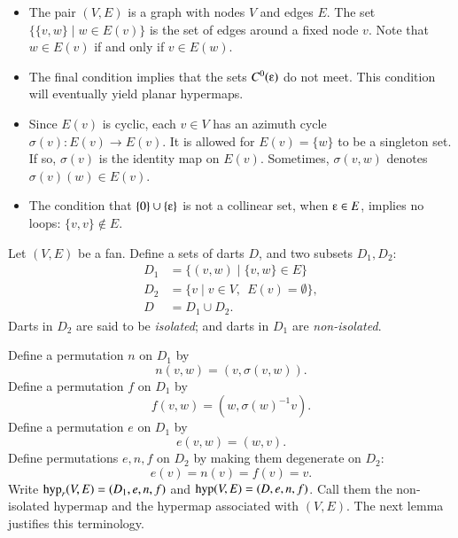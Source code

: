 \begin{remark}
\begin{itemize}
\item The pair $(V,E)$ is a graph with nodes $V$ and edges $E$.  The set
$\{\{v,w\}\mid w\in E(v)\}$ is the set of edges around a fixed node $v$.
Note that $w\in E(v)$ if and only if $v\in E(w)$.   
%
\item The final condition implies that the sets $C^0(\e)$
do not meet.   This condition will eventually yield planar
hypermaps.
%
\item
Since $E(v)$ is cyclic,
each $v\in V$ has an azimuth cycle $\sigma(v):E(v)\to E(v)$.
It is allowed for $E(v) = \{w\}$ to be a
singleton set. If so,
$\sigma(v)$ is the identity map on $E(v)$.
%
Sometimes,   $\sigma(v,w)$ denotes $\sigma(v)(w)\in E(v)$.
%
\item 
The condition that $\{0\}\cup \{\e\}$ is not a collinear set, when $\e\in
E$, implies no loops: $\{v,v\}\not\in E$.
%
\end{itemize}
\end{remark}


Let $(V,E)$ be a fan.  Define a sets of darts $D$, and
two subsets $D_1,D_2$:
    $$
    \begin{array}{lll}
    D_1 &= \{(v,w)\mid \{v,w\}\in E\}\\
    D_2 &= \{v \mid v\in V,\ \ E(v) = \emptyset\},\\
    D   &= D_1\cup D_2.
    \end{array}
    $$
Darts in $D_2$ are said to be {\it isolated}; and darts in $D_1$ are {\it non-isolated}.
%

Define a permutation $n$ on $D_1$ by
    $$n(v,w) = (v,\sigma(v,w)).$$
Define a permutation $f$ on $D_1$ by
    $$
    f (v,w) = (w,\sigma(w)^{-1} v).
    $$
Define a permutation $e$ on $D_1$ by
    $$
    e (v,w) = (w,v).
    $$
Define permutations $e,n,f$ on $D_2$ by making them degenerate on $D_2$:
    $$
    e (v) = n(v) = f(v) = v.
    $$
Write ${\operatorname{hyp}}_r(V,E)=(D_1,e,n,f)$ and ${\operatorname{hyp}}(V,E)=(D,e,n,f)$.  Call them the non-isolated hypermap
and the hypermap associated with $(V,E)$.  The next
lemma justifies this terminology.



